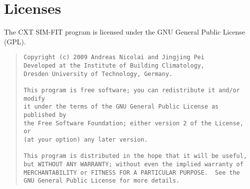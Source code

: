 \documentclass[a4paper,fleqn,11pt]{article}
\numberwithin{equation}{section}
\begin{document}
\section{Licenses}
The CXT SIM-FIT program is licensed under the GNU General Public License (GPL).

\begin{quote}
\footnotesize
\begin{verbatim}
Copyright (c) 2009 Andreas Nicolai and Jingjing Pei
Developed at the Institute of Building Climatology,
Dresden University of Technology, Germany.

This program is free software; you can redistribute it and/or modify
it under the terms of the GNU General Public License as published by
the Free Software Foundation; either version 2 of the License, or
(at your option) any later version.

This program is distributed in the hope that it will be useful,
but WITHOUT ANY WARRANTY; without even the implied warranty of
MERCHANTABILITY or FITNESS FOR A PARTICULAR PURPOSE.  See the
GNU General Public License for more details.
\end{verbatim}
\end{quote}
\end{document}
